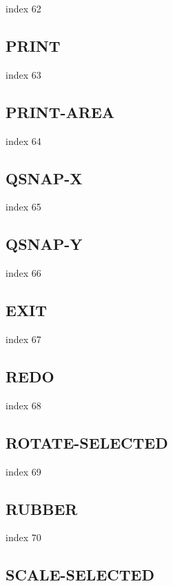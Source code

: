 \documentclass[a4paper]{report}
\begin{document}
{{{{{{{{{{{{{index 62

\subsection{PRINT}

index 63

\subsection{PRINT-AREA}

index 64

\subsection{QSNAP-X}

index 65

\subsection{QSNAP-Y}

index 66

\subsection{EXIT}

 index 67

\subsection{REDO}

index 68

\subsection{ROTATE-SELECTED}

index 69

\subsection{RUBBER}

index 70

\subsection{SCALE-SELECTED}

}}}}}}}}}}}}}
\end{document}
